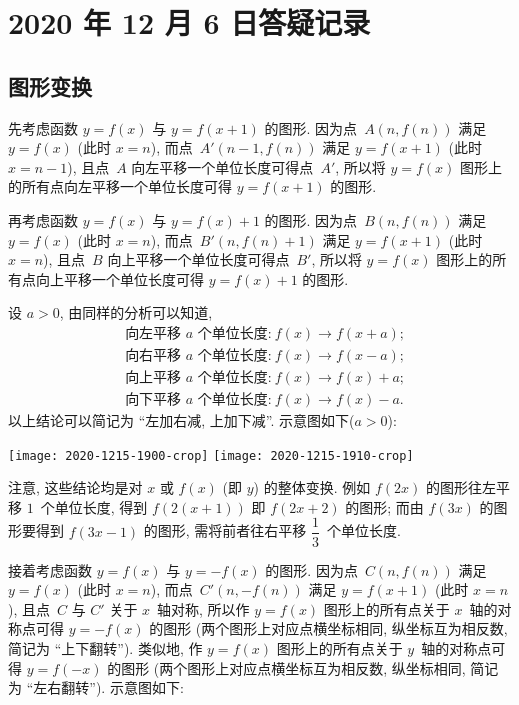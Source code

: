 \section{2020 年 12 月 6 日答疑记录}

\subsection{图形变换}

先考虑函数 $y=f(x)$ 与 $y=f(x+1)$ 的图形. 因为点~$A(n,f(n))$ 满足 $y=f(x)$ (此时 $x=n$), 而点~$A'(n-1,f(n))$ 满足 $y=f(x+1)$ (此时 $x=n-1$), 且点~$A$ 向左平移一个单位长度可得点~$A'$, 所以将 $y=f(x)$ 图形上的所有点向左平移一个单位长度可得 $y=f(x+1)$ 的图形.

再考虑函数 $y=f(x)$ 与 $y=f(x)+1$ 的图形. 因为点~$B(n,f(n))$ 满足 $y=f(x)$ (此时 $x=n$), 而点~$B'(n,f(n)+1)$ 满足 $y=f(x+1)$ (此时 $x=n$), 且点~$B$ 向上平移一个单位长度可得点~$B'$, 所以将 $y=f(x)$ 图形上的所有点向上平移一个单位长度可得 $y=f(x)+1$ 的图形.

设 $a>0$, 由同样的分析可以知道, 
\[\begin{aligned}
    &\text{向左平移 $a$ 个单位长度:}\ f(x)\rightarrow f(x+a);\\
    &\text{向右平移 $a$ 个单位长度:}\ f(x)\rightarrow f(x-a);\\
    &\text{向上平移 $a$ 个单位长度:}\ f(x)\rightarrow f(x)+a;\\
    &\text{向下平移 $a$ 个单位长度:}\ f(x)\rightarrow f(x)-a.
\end{aligned}\]
以上结论可以简记为 ``左加右减, 上加下减''. 示意图如下($a>0$):

    \begin{center}
        \texttt{[image: 2020-1215-1900-crop]}\qquad
        \texttt{[image: 2020-1215-1910-crop]}
    \end{center}

注意, 这些结论均是对 $x$ 或 $f(x)$ (即 $y$) 的整体变换. 例如 $f(2x)$ 的图形往左平移 $1$~个单位长度, 得到 $f(2(x+1))$ 即 $f(2x+2)$ 的图形; 而由 $f(3x)$ 的图形要得到 $f(3x-1)$ 的图形, 需将前者往右平移 $\dfrac13$~个单位长度.

接着考虑函数 $y=f(x)$ 与 $y=-f(x)$ 的图形. 因为点~$C(n,f(n))$ 满足 $y=f(x)$ (此时 $x=n$), 而点~$C'(n,-f(n))$ 满足 $y=f(x+1)$ (此时 $x=n$), 且点~$C$ 与 $C'$ 关于 $x$~轴对称, 所以作 $y=f(x)$ 图形上的所有点关于 $x$~轴的对称点可得 $y=-f(x)$ 的图形 (两个图形上对应点横坐标相同, 纵坐标互为相反数, 简记为 ``上下翻转''). 类似地, 作 $y=f(x)$ 图形上的所有点关于 $y$~轴的对称点可得 $y=f(-x)$ 的图形 (两个图形上对应点横坐标互为相反数, 纵坐标相同, 简记为 ``左右翻转''). 示意图如下:

